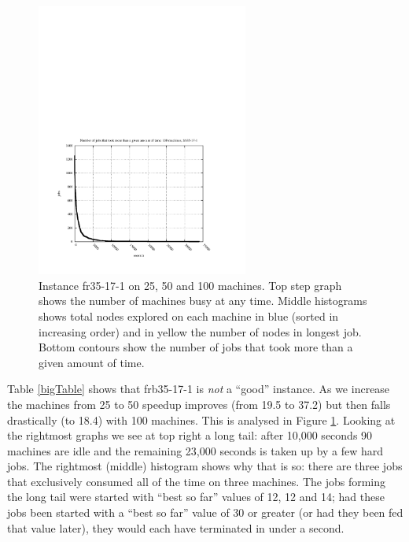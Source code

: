 \documentclass{l4proj}
\begin{document}
\begin{figure}
\begin{center}
\begin{minipage}[t]{0.3\textwidth}
\end{minipage}
\hfill
\begin{minipage}[t]{0.3\textwidth}
\includegraphics[height=9.0cm]{jobSizes-run100-frb35-17-1.pdf}
\end{minipage}
\end{center}
\caption{Instance fr35-17-1 on 25, 50 and 100 machines. Top step graph shows the number of machines busy at any time. Middle histograms shows 
total nodes explored on each machine in blue (sorted in increasing order) and in yellow the number of nodes in longest job. 
Bottom contours show the number of jobs that took more than a given amount of time.}
\label{frb35-17-1}
\end{figure}

Table \ref{bigTable} shows that frb35-17-1 is \emph{not} a ``good'' instance. As we increase the machines from 25 to 50 
speedup improves (from 19.5 to 37.2) but then falls drastically (to 18.4) with 100 machines.
This is analysed in Figure \ref{frb35-17-1}. Looking at the rightmost graphs we see 
at top right a long tail: after 10,000 seconds 90 machines are idle and the remaining 23,000 seconds is taken up by a few
hard jobs. The rightmost (middle) histogram shows why that is so: there are three jobs that exclusively consumed all of the time on
three machines. The jobs forming the long tail were started with ``best
so far'' values of 12, 12 and 14; had these jobs been started with a ``best so
far'' value of 30 or greater (or had they been fed that value later), they would each have terminated in under a second. 
\end{document}
